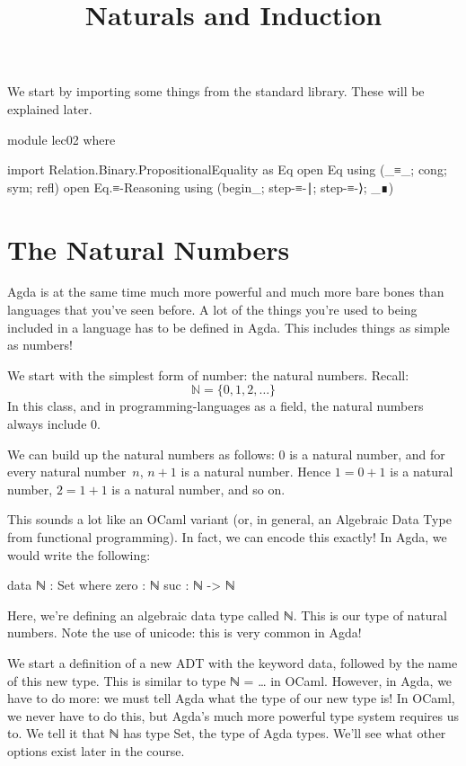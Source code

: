 \documentclass{lecturenotes}
\title{Naturals and Induction}
\newcommand{\agdanats}{\textsf{ℕ}\xspace}
\begin{document}
\maketitle

We start by importing some things from the standard library.
These will be explained later.
\begin{center}
\begin{code}
  module lec02 where
  
  import Relation.Binary.PropositionalEquality as Eq
  open Eq using (_≡_; cong; sym; refl)
  open Eq.≡-Reasoning using (begin_; step-≡-∣; step-≡-⟩; _∎)
\end{code}
\end{center}

\section{The Natural Numbers}
\label{sec:natural-numbers}

Agda is at the same time much more powerful and much more bare bones than languages that you've seen before.
A lot of the things you're used to being included in a language has to be defined in Agda.
This includes things as simple as numbers!

We start with the simplest form of number: the natural numbers.
Recall: $$\mathbb{N} = \{0, 1, 2, \dots\}$$
In this class, and in programming-languages as a field, the natural numbers always include $0$.

We can build up the natural numbers as follows: $0$ is a natural number, and for every natural number~$n$, $n + 1$ is a natural number.
Hence $1 = 0 + 1$ is a natural number, $2 = 1 + 1$ is a natural number, and so on.

This sounds a lot like an OCaml variant (or, in general, an Algebraic Data Type from functional programming).
In fact, we can encode this exactly!
In Agda, we would write the following:
\begin{center}
\begin{code}
  data ℕ : Set where
    zero : ℕ
    suc : ℕ -> ℕ
\end{code}
\end{center}
Here, we're defining an algebraic data type called \agdanats.
This is our type of natural numbers.
Note the use of unicode: this is very common in Agda!

We start a definition of a new ADT with the keyword \textsf{data}, followed by the name of this new type.
This is similar to \textsf{type ℕ = \dots} in OCaml.
However, in Agda, we have to do more: we must tell Agda what the type of our new type is!
In OCaml, we never have to do this, but Agda's much more powerful type system requires us to.
We tell it that \agdanats has type \textsf{Set}, the type of Agda types.
We'll see what other options exist later in the course.
\end{document}
